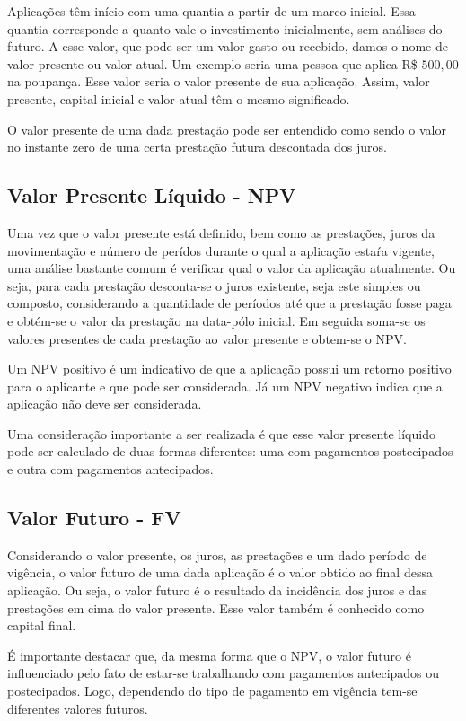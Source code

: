 Aplicações têm início com uma quantia a partir de um marco inicial. Essa quantia corresponde a quanto vale o investimento inicialmente, sem análises do futuro. A esse valor, que pode ser um valor gasto ou recebido, damos o nome de valor presente ou valor atual. Um exemplo seria uma pessoa que aplica R\$ $500,00$ na poupança. Esse valor seria o valor presente de sua aplicação. Assim, valor presente, capital inicial e valor atual têm o mesmo significado.

O valor presente de uma dada prestação pode ser entendido como sendo o valor no instante zero de uma certa prestação futura descontada dos juros.

\subsection{Valor Presente Líquido - NPV}

Uma vez que o valor presente está definido, bem como as prestações, juros da movimentação e número de perídos durante o qual a aplicação estaŕa vigente, uma análise bastante comum é verificar qual o valor da aplicação atualmente. Ou seja, para cada prestação desconta-se o juros existente, seja este simples ou composto, considerando a quantidade de períodos até que a prestação fosse paga e obtém-se o valor da prestação na data-pólo inicial. Em seguida soma-se os valores presentes de cada prestação ao valor presente e obtem-se o NPV.

Um NPV positivo é um indicativo de que a aplicação possui um retorno positivo para o aplicante e que pode ser considerada. Já um NPV negativo indica que a aplicação não deve ser considerada.

Uma consideração importante a ser realizada é que esse valor presente líquido pode ser calculado de duas formas diferentes: uma com pagamentos postecipados e outra com pagamentos antecipados.

\subsection{Valor Futuro - FV}

Considerando o valor presente, os juros, as prestações e um dado período de vigência, o valor futuro de uma dada aplicação é o valor obtido ao final dessa aplicação. Ou seja, o valor futuro é o resultado da incidência dos juros e das prestações em cima do valor presente. Esse valor também é conhecido como capital final.

É importante destacar que, da mesma forma que o NPV, o valor futuro é influenciado pelo fato de estar-se trabalhando com pagamentos antecipados ou postecipados. Logo, dependendo do tipo de pagamento em vigência tem-se diferentes valores futuros.

